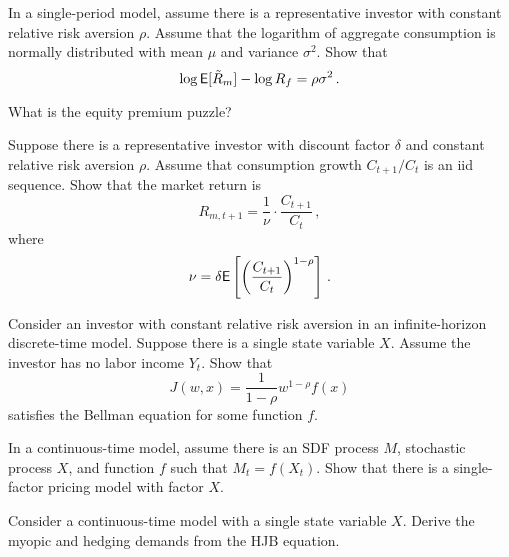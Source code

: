 \newpage

\item {} In a single-period model, assume there is a representative investor with constant relative risk aversion $\rho$.  Assume that the logarithm of aggregate consumption is normally distributed with mean $\mu$ and variance $\sigma^2$.  Show that
$$\log \mathsf{E}[\tilde{R}_m] - \log R_f = \rho \sigma^2\,.$$

\newpage
\item {} What is the equity premium puzzle?

\newpage

\item {} Suppose there is a representative investor with discount factor $\delta$ and constant relative risk aversion $\rho$.  Assume that consumption growth $C_{t+1}/C_t$ is an iid sequence.  Show that the market return is 
$$R_{m,t+1} = \frac{1}{\nu} \cdot \frac{C_{t+1}}{C_t}\,,$$
where
$$\nu = \delta \mathsf{E}\left[\left(\frac{C_{t+1}}{C_t}\right)^{1-\rho}\right]\,.$$

\newpage
\item {} Consider an investor with constant relative risk aversion in an infinite-horizon discrete-time model.  Suppose there is a single state variable $X$.  Assume the investor has no labor income $Y_t$.  Show that  
$$J(w,x) = \frac{1}{1-\rho}w^{1-\rho}f(x)$$
satisfies the Bellman equation for some function $f$.

\newpage
\item {} In a continuous-time model, assume there is an SDF process $M$, stochastic process $X$, and function $f$ such that $M_t = f(X_t)$.  Show that there is a single-factor pricing model with factor $X$.

\newpage
\item {} Consider a continuous-time model with a single state variable $X$.  Derive the myopic and hedging demands from the HJB equation.  

